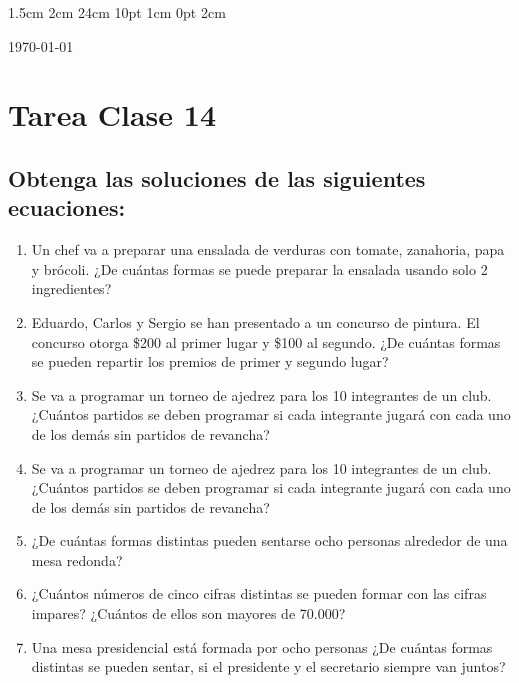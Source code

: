 \documentclass[12pt,letterpaper]{report}
\begin{document}
\setmargins{2.5cm}      
{1.5cm}                     
{2cm}  
{24cm}                    
{10pt}                          
{1cm}                          
{0pt}                             
{2cm}
\begin{flushright}
\today
\end{flushright}
\vspace{-1.75cm}
\section*{Tarea Clase 14}
\subsection*{Obtenga las soluciones de las siguientes ecuaciones:}
\begin{enumerate}
\item Un chef va a preparar una ensalada de verduras con tomate, zanahoria, papa y brócoli. ¿De cuántas formas se puede preparar la ensalada usando solo 2 ingredientes?
\item Eduardo, Carlos y Sergio se han presentado a un concurso de pintura. El concurso otorga \$200 al primer lugar y  \$100 al segundo. ¿De cuántas formas se pueden repartir los premios de primer y segundo lugar?
\item Se va a programar un torneo de ajedrez para los 10 integrantes de un club. ¿Cuántos partidos se deben programar si cada integrante jugará con cada uno de los demás sin partidos de revancha?
\item Se va a programar un torneo de ajedrez para los 10 integrantes de un club. ¿Cuántos partidos se deben programar si cada integrante jugará con cada uno de los demás sin partidos de revancha?
\item ¿De cuántas formas distintas pueden sentarse ocho personas alrededor de una mesa redonda?
\item ¿Cuántos números de cinco cifras distintas se pueden formar con las cifras impares? ¿Cuántos de ellos son mayores de 70.000?
\item Una mesa presidencial está formada por ocho personas ¿De cuántas formas distintas se pueden sentar, si el presidente y el secretario siempre van juntos?
\end{enumerate}
\end{document}
